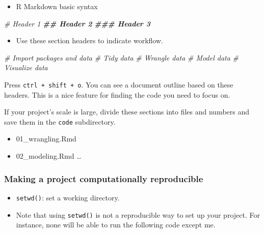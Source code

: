 \documentclass[
]{book}
\newenvironment{Shaded}{\begin{snugshade}}{\end{snugshade}}
\newcommand{\CommentTok}[1]{\textcolor[rgb]{0.56,0.35,0.01}{\textit{#1}}}
\newcommand{\DocumentationTok}[1]{\textcolor[rgb]{0.56,0.35,0.01}{\textbf{\textit{#1}}}}
\providecommand{\tightlist}{%
  \setlength{\itemsep}{0pt}\setlength{\parskip}{0pt}}
\begin{document}
\begin{itemize}
\tightlist
\item
  R Markdown basic syntax
\end{itemize}

\begin{Shaded}
\begin{Highlighting}[]
\CommentTok{\# Header 1}
\DocumentationTok{\#\# Header 2}
\DocumentationTok{\#\#\# Header 3}
\end{Highlighting}
\end{Shaded}

\begin{itemize}
\tightlist
\item
  Use these section headers to indicate workflow.
\end{itemize}

\begin{Shaded}
\begin{Highlighting}[]
\CommentTok{\# Import packages and data}
\CommentTok{\# Tidy data}
\CommentTok{\# Wrangle data}
\CommentTok{\# Model data}
\CommentTok{\# Visualize data}
\end{Highlighting}
\end{Shaded}

Press \texttt{ctrl\ +\ shift\ +\ o}. You can see a document outline based on these headers. This is a nice feature for finding the code you need to focus on.

If your project's scale is large, divide these sections into files and numbers and save them in the \texttt{code} subdirectory.

\begin{itemize}
\tightlist
\item
  01\_wrangling.Rmd
\item
  02\_modeling.Rmd
  \ldots{}
\end{itemize}

\hypertarget{making-a-project-computationally-reproducible}{%
\subsubsection{Making a project computationally reproducible}\label{making-a-project-computationally-reproducible}}

\begin{itemize}
\item
  \texttt{setwd()}: set a working directory.
\item
  Note that using \texttt{setwd()} is not a reproducible way to set up your project. For instance, none will be able to run the following code except me.
\end{itemize}
\end{document}
